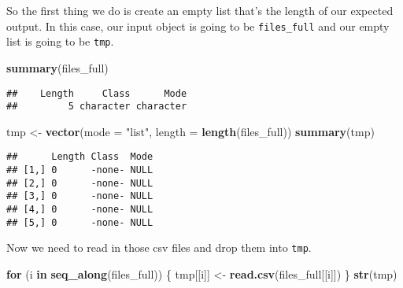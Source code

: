 \documentclass[
]{article}
\newenvironment{Shaded}{\begin{snugshade}}{\end{snugshade}}
\newcommand{\ControlFlowTok}[1]{\textcolor[rgb]{0.13,0.29,0.53}{\textbf{#1}}}
\newcommand{\DataTypeTok}[1]{\textcolor[rgb]{0.13,0.29,0.53}{#1}}
\newcommand{\KeywordTok}[1]{\textcolor[rgb]{0.13,0.29,0.53}{\textbf{#1}}}
\newcommand{\NormalTok}[1]{#1}
\newcommand{\StringTok}[1]{\textcolor[rgb]{0.31,0.60,0.02}{#1}}
\begin{document}
So the first thing we do is create an empty list that's the length of
our expected output. In this case, our input object is going to be
\texttt{files\_full} and our empty list is going to be \texttt{tmp}.

\begin{Shaded}
\begin{Highlighting}[]
\KeywordTok{summary}\NormalTok{(files_full)}
\end{Highlighting}
\end{Shaded}

\begin{verbatim}
##    Length     Class      Mode 
##         5 character character
\end{verbatim}

\begin{Shaded}
\begin{Highlighting}[]
\NormalTok{tmp <-}\StringTok{ }\KeywordTok{vector}\NormalTok{(}\DataTypeTok{mode =} \StringTok{"list"}\NormalTok{, }\DataTypeTok{length =} \KeywordTok{length}\NormalTok{(files_full))}
\KeywordTok{summary}\NormalTok{(tmp)}
\end{Highlighting}
\end{Shaded}

\begin{verbatim}
##      Length Class  Mode
## [1,] 0      -none- NULL
## [2,] 0      -none- NULL
## [3,] 0      -none- NULL
## [4,] 0      -none- NULL
## [5,] 0      -none- NULL
\end{verbatim}

Now we need to read in those csv files and drop them into \texttt{tmp}.

\begin{Shaded}
\begin{Highlighting}[]
\ControlFlowTok{for}\NormalTok{ (i }\ControlFlowTok{in} \KeywordTok{seq_along}\NormalTok{(files_full)) \{}
\NormalTok{        tmp[[i]] <-}\StringTok{ }\KeywordTok{read.csv}\NormalTok{(files_full[[i]])}
\NormalTok{\}}
\KeywordTok{str}\NormalTok{(tmp)}
\end{Highlighting}
\end{Shaded}
\end{document}
